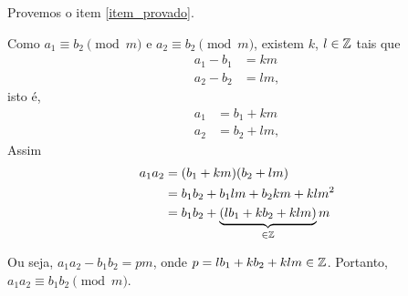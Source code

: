 \documentclass{beamer}
\begin{document}
    \begin{frame}
        \begin{prova}
            Provemos o item \ref{item_provado}.
            
            Como $a_{1}\equiv b_{2}\pmod{m}$ e $a_{2}\equiv b_{2}\pmod{m}$, existem $k$, $l \in \mathbb{Z}$ tais que
            \begin{align*}
                a_1 - b_1 &= km\\
                a_2 - b_2 &= lm,
            \end{align*}
            isto \'e,
            \begin{align*}
                a_1 &= b_1 + km\\
                a_2 &= b_2 + lm,
            \end{align*}
            Assim
            \begin{align*}
                a_1a_2 &= (b_1 + km)(b_2 + lm) \\ &= b_1b_2 + b_1lm + b_2km + klm^2 \\ &= b_1b_2 + \underbrace{(lb_{1}+kb_{2}+klm)}_{\in \mathbb{Z}}m
            \end{align*}
            
            Ou seja, $a_1a_2 - b_1b_2 = pm$, onde $p = lb_1 + kb_2 + klm \in \mathbb{Z}$. Portanto, $a_1a_2 \equiv b_1b_2 \pmod{m}$.
        \end{prova}
    \end{frame}
\end{document}
